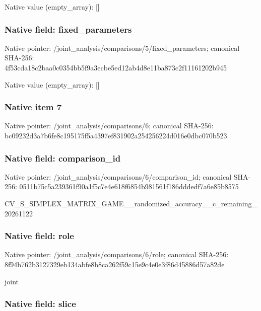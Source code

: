 \documentclass[10pt,a4paper]{article}
\begin{document}
Native value (empty\_array): []



\subsubsection{Native field: fixed\_parameters}


Native pointer: /joint\_analysis/comparis\allowbreak{}ons/5/fixed\_parameters; canonical SHA-256: 4f53cda18c2baa0c0354bb5f\allowbreak{}9a3ecbe5ed12ab4d8e11ba87\allowbreak{}3c2f11161202b945



Native value (empty\_array): []



\subsubsection{Native item 7}


Native pointer: /joint\_analysis/comparisons/6; canonical SHA-256: bc09232d3a7b6fe8c195175f\allowbreak{}5a4397ef831902a254256224\allowbreak{}d016e0dbc070b523



\subsubsection{Native field: comparison\_id}


Native pointer: /joint\_analysis/comparis\allowbreak{}ons/6/comparison\_id; canonical SHA-256: 0511b75c5a239361f90a1f5c\allowbreak{}7e4e618f6854b981561f186d\allowbreak{}ddedf7a6e85b8575


CV\_S\_SIMPLEX\_MATRIX\_GAME\allowbreak{}\_\_randomized\_accuracy\_\_c\allowbreak{}\_remaining\_20261122


\subsubsection{Native field: role}


Native pointer: /joint\_analysis/comparisons/6/role; canonical SHA-256: 8f94b762b3127329eb134abf\allowbreak{}e8b8ca262f59c15e9c4e0e3f\allowbreak{}86d45886d57a82de


joint


\subsubsection{Native field: slice}
\end{document}
